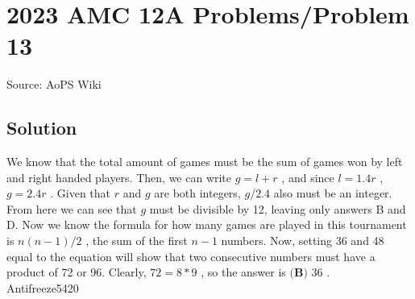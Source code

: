 \documentclass[12pt]{article}
\begin{document}
\section*{{2023 AMC 12A Problems/Problem 13}}
Source: AoPS Wiki

\subsection*{Solution}
We know that the total amount of games must be the sum of games won by left and right handed players. Then, we can write $g = l + r$ , and since $l = 1.4r$ , $g = 2.4r$ . Given that $r$ and $g$ are both integers, $g/2.4$ also must be an integer. From here we can see that $g$ must be divisible by 12, leaving only answers B and D. Now we know the formula for how many games are played in this tournament is $n(n-1)/2$ , the sum of the first $n-1$ numbers. Now, setting 36 and 48 equal to the equation will show that two consecutive numbers must have a product of 72 or 96. Clearly, $72=8*9$ , so the answer is $\boxed{\textbf{(B) }36}$ . ~~ Antifreeze5420
\end{document}

